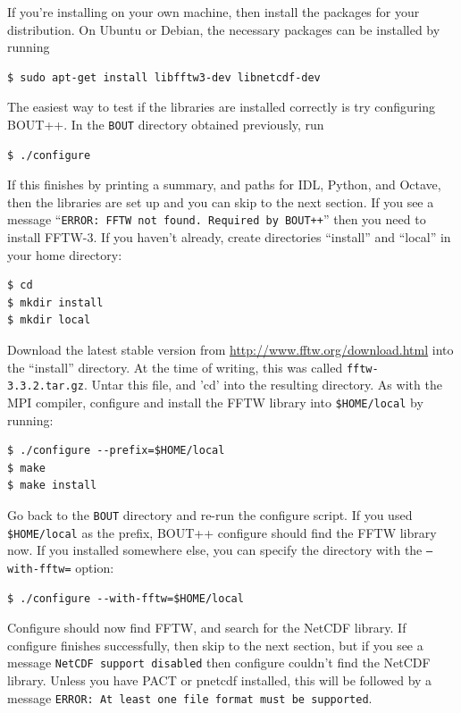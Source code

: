 \documentclass[12pt]{article}
\begin{document}
If you're installing on your own machine, then install the packages for your
distribution. On Ubuntu or Debian, the necessary packages can be installed by
running
%
\begin{verbatim}
$ sudo apt-get install libfftw3-dev libnetcdf-dev
\end{verbatim}
%
The easiest way to test if the libraries are installed correctly is try
configuring BOUT++. In the \texttt{BOUT} directory obtained previously, run
%
\begin{verbatim}
$ ./configure
\end{verbatim}
%
If this finishes by printing a summary, and paths for IDL, Python, and Octave,
then the libraries are set up and you can skip to the next section.  If you see
a message ``\texttt{ERROR: FFTW not found. Required by BOUT++}'' then you need
to install FFTW-3. If you haven't already, create directories ``install'' and
``local'' in your home directory:
%
\begin{verbatim}
$ cd
$ mkdir install
$ mkdir local
\end{verbatim}
%
Download the latest stable version from \url{http://www.fftw.org/download.html}
into the ``install'' directory. At the time of writing, this was called
\texttt{fftw-3.3.2.tar.gz}. Untar this file, and 'cd' into the resulting
directory. As with the MPI compiler, configure and install the FFTW library
into \texttt{\$HOME/local} by running:
%
\begin{verbatim}
$ ./configure --prefix=$HOME/local
$ make
$ make install
\end{verbatim}
%
Go back to the \texttt{BOUT} directory and re-run the configure script.  If you
used \texttt{\$HOME/local} as the prefix, BOUT++ configure should find the FFTW
library now. If you installed somewhere else, you can specify the directory
with the \texttt{--with-fftw=} option:
%
\begin{verbatim}
$ ./configure --with-fftw=$HOME/local
\end{verbatim}
%
Configure should now find FFTW, and search for the NetCDF library. If configure
finishes successfully, then skip to the next section, but if you see a message
\texttt{NetCDF support disabled} then configure couldn't find the NetCDF
library. Unless you have PACT or pnetcdf installed, this will be followed by a
message \texttt{ERROR: At least one file format must be supported}.
\end{document}
